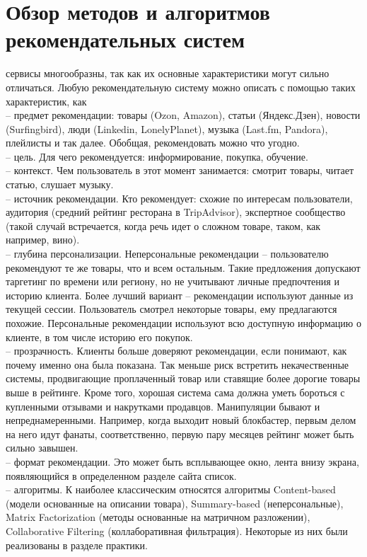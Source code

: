 \documentclass{article}
\newcommand\tab[1][1cm]{\hspace*{#1}}
\begin{document}
\section{Обзор методов и алгоритмов рекомендательных систем}
 сервисы многообразны, так как их основные характеристики могут сильно отличаться. Любую рекомендательную систему можно описать с помощью таких характеристик, как \\
\tab– предмет рекомендации: товары (Ozon, Amazon), статьи (Яндекс.Дзен), новости (Surfingbird), люди (Linkedin, LonelyPlanet), музыка (Last.fm, Pandora), плейлисты и так далее. Обобщая, рекомендовать можно что угодно. \\
\tab– цель. Для чего рекомендуется: информирование, покупка, обучение. \\
\tab– контекст. Чем пользователь в этот момент занимается: смотрит товары, читает статью, слушает музыку. \\
\tab– источник рекомендации. Кто рекомендует: схожие по интересам пользователи, аудитория (средний рейтинг ресторана в TripAdvisor), экспертное сообщество (такой случай встречается, когда речь идет о сложном товаре, таком, как например, вино).\\
\tab– глубина персонализации. Неперсональные рекомендации – пользователю рекомендуют те же товары, что и всем остальным. Такие предложения допускают таргетинг по времени или региону, но не учитывают личные предпочтения и историю клиента. Более лучший вариант – рекомендации используют данные из текущей сессии. Пользователь смотрел некоторые товары, ему предлагаются похожие. Персональные рекомендации используют всю доступную информацию о клиенте, в том числе историю его покупок.\\
\tab– прозрачность. Клиенты больше доверяют рекомендации, если понимают, как почему именно она была показана. Так меньше риск встретить некачественные системы, продвигающие проплаченный товар или ставящие более дорогие товары выше в рейтинге. Кроме того, хорошая система сама должна уметь бороться с купленными отзывами и накрутками продавцов. Манипуляции бывают и непреднамеренными. Например, когда выходит новый блокбастер, первым делом на него идут фанаты, соответственно, первую пару месяцев рейтинг может быть сильно завышен.\\
\tab– формат рекомендации. Это может быть всплывающее окно, лента внизу экрана, появляющийся в определенном разделе сайта список.\\
\tab– алгоритмы. К наиболее классическим относятся алгоритмы Content-based (модели основанные на описании товара), Summary-based (неперсональные), Matrix Factorization (методы основанные на матричном разложении), Collaborative Filtering (коллаборативная фильтрация). Некоторые из них были реализованы в разделе практики.
\newpage
\end{document}
